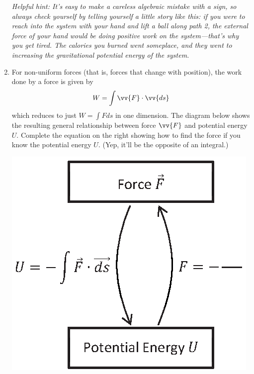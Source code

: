 \begin{enumerate}[labparts]
\textit{Helpful hint: It's easy to make a careless algebraic mistake with a sign, so always check yourself by telling yourself a little story like this: if you were to reach into the system with your hand and lift a ball along path 2, the external force of your hand would be doing \textit{positive} work on the system---that's why you get tired.  The calories you burned went someplace, and they went to \textit{increasing} the gravitational potential energy of the system. }

\pagebreak[3]

\item For non-uniform forces (that is, forces that change with position), the work done by a force is given by 
$$W=\int{\vv{F} \cdot \vv{ds}}$$
which reduces to just $W=\int{F ds}$ in one dimension.  The diagram below shows the resulting general relationship between force $\vv{F}$ and potential energy $U$.  Complete the equation on the right showing how to find the force if you know the potential energy $U$.  (Yep, it'll be the opposite of an integral.)
\begin{center}
\vspace{-0.1in}
\includegraphics{potential_intro/concept_map_figs/concept_map_F_and_U_blank_squish.eps}
\end{center}



\end{enumerate}
